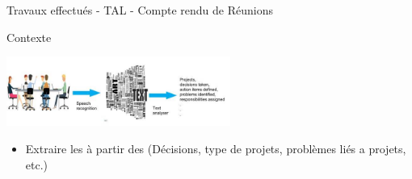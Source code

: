 \documentclass{beamer}
\newcommand{\imp}[1]{\textbf{{\color{blue}{#1}}}}
\begin{document}
{{%
%
%   
%


\begin{frame}{Travaux effectués - TAL - Compte rendu de Réunions }
\vspace{-0.3cm}
\begin{block}{Contexte}
	\begin{center}
     \includegraphics[width=0.55\textwidth]{images/reus-image} \\
	\end{center}
\vspace{-0.5cm}
\begin{itemize}
\item Extraire les \imp{informations importantes} à partir des \imp{transcriptions de réunions} (Décisions, type de projets, problèmes liés a projets, etc.)
\end{itemize}
\end{block}



\end{frame}}}
\end{document}
